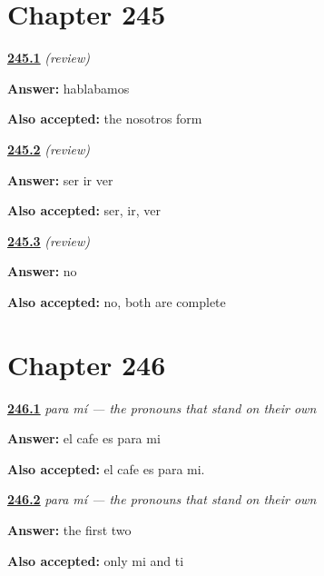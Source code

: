 \section*{Chapter 245}

\noindent\begin{minipage}[t]{\linewidth}
\raggedright
\hyperlink{review-ES-C63-repaso-paradigmas-accent}{\textbf{245.1}} \emph{(review)}\par
\small \textbf{Answer:} hablabamos\par
\footnotesize \textbf{Also accepted:} the nosotros form
\end{minipage}\par\medskip

\noindent\begin{minipage}[t]{\linewidth}
\raggedright
\hyperlink{review-ES-C63-repaso-paradigmas-three}{\textbf{245.2}} \emph{(review)}\par
\small \textbf{Answer:} ser ir ver\par
\footnotesize \textbf{Also accepted:} ser, ir, ver
\end{minipage}\par\medskip

\noindent\begin{minipage}[t]{\linewidth}
\raggedright
\hyperlink{review-ES-C63-repaso-paradigmas-owed}{\textbf{245.3}} \emph{(review)}\par
\small \textbf{Answer:} no\par
\footnotesize \textbf{Also accepted:} no, both are complete
\end{minipage}\par\medskip

\section*{Chapter 246}

\noindent\begin{minipage}[t]{\linewidth}
\raggedright
\hyperlink{review-ES-C64-para-mi-say}{\textbf{246.1}} \emph{para mí — the pronouns that stand on their own}\par
\small \textbf{Answer:} el cafe es para mi\par
\footnotesize \textbf{Also accepted:} el cafe es para mi.
\end{minipage}\par\medskip

\noindent\begin{minipage}[t]{\linewidth}
\raggedright
\hyperlink{review-ES-C64-para-mi-third}{\textbf{246.2}} \emph{para mí — the pronouns that stand on their own}\par
\small \textbf{Answer:} the first two\par
\footnotesize \textbf{Also accepted:} only mi and ti
\end{minipage}\par\medskip

